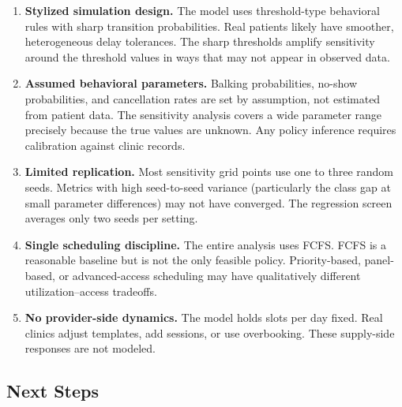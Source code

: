 \documentclass[11pt]{article}
\begin{document}
\begin{enumerate}

\item \textbf{Stylized simulation design.}
The model uses threshold-type behavioral rules with sharp transition
probabilities. Real patients likely have smoother, heterogeneous delay
tolerances. The sharp thresholds amplify sensitivity around the threshold
values in ways that may not appear in observed data.

\item \textbf{Assumed behavioral parameters.}
Balking probabilities, no-show probabilities, and cancellation rates are
set by assumption, not estimated from patient data. The sensitivity analysis
covers a wide parameter range precisely because the true values are unknown.
Any policy inference requires calibration against clinic records.

\item \textbf{Limited replication.}
Most sensitivity grid points use one to three random seeds. Metrics with
high seed-to-seed variance (particularly the class gap at small
parameter differences) may not have converged. The regression screen averages
only two seeds per setting.

\item \textbf{Single scheduling discipline.}
The entire analysis uses FCFS. FCFS is a reasonable baseline but is not
the only feasible policy. Priority-based, panel-based, or advanced-access
scheduling may have qualitatively different utilization--access tradeoffs.

\item \textbf{No provider-side dynamics.}
The model holds slots per day fixed. Real clinics adjust templates, add
sessions, or use overbooking. These supply-side responses are not modeled.

\end{enumerate}

\subsection{Next Steps}
\end{document}
